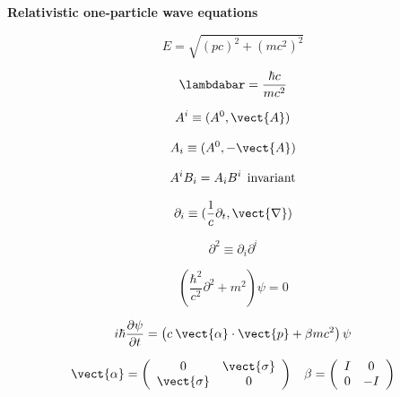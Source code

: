 {\bf Relativistic one-particle wave equations}

\begin{equation}
E = \sqrt{(pc)^2+(mc^2)^2}
\end{equation}

\begin{equation}
\lambdabar = \frac{\hbar c}{mc^2}
\end{equation}

\begin{equation}
A^i \equiv (A^0, \vect{A})
\end{equation}

\begin{equation}
A_i \equiv (A^0, -\vect{A})
\end{equation}

\begin{equation}
A^i B_i = A_i B^i \:\: {\rm invariant}
\end{equation}

\begin{equation}
\partial_i \equiv (\frac{1}{c}\partial_t, \vect{\nabla})
\end{equation}

\begin{equation}
\partial^2 \equiv \partial_{i} \partial^{i}
\end{equation}

\begin{equation}
\left( \frac{\hbar^2}{c^2} \partial^2 + m^2 \right) \psi = 0
\end{equation}

\begin{equation}
i \hbar \frac{\partial \psi}{\partial t} =
 \left( c \: \vect{\alpha} \cdot \vect{p} + \beta mc^2 \right) \psi
\end{equation}

\begin{equation}
\vect{\alpha} = \left(
                   \begin{array}{cc}
                     0 & \vect{\sigma} \\
                     \vect{\sigma} & 0
                   \end{array}
                \right)
\:\:\:\:
\beta = \left(
           \begin{array}{cc}
              I & 0 \\
              0 & -I
           \end{array}
        \right)
\end{equation}

